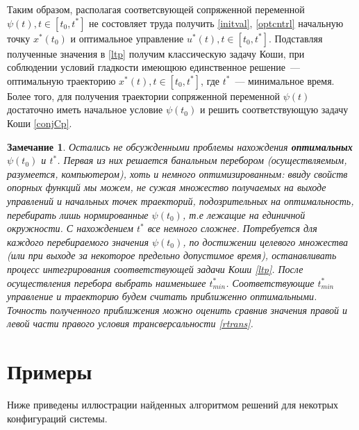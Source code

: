 \documentclass[oneside,final,11pt]{article}
\newcommand*\segm[2]{[#1,#2]}
\newtheorem*{remark}{Замечание}
\begin{document}
Таким образом, располагая соответсвующей сопряженной переменной \(\psi(t), t \in \segm{t_0}{t^*}\) не состовляет труда получить \eqref{initval}, \eqref{optcntrl} начальную точку \(x^*(t_0)\) и оптимальное управление \(u^*(t), t \in \segm{t_0}{t^*}\). Подставляя полученные значения в \eqref{ltp} получим классическую задачу Коши, при соблюдении условий гладкости имеющюю единственное решение~--- оптимальную траекторию \(x^*(t), t \in \segm{t_0}{t^*}\), где \(t^*\)~--- минимальное время. Более того, для получения траектории сопряженной переменной \(\psi(t)\) достаточно иметь начальное условие \(\psi(t_0)\) и решить соответствующую задачу Коши \eqref{conjCp}.
		{\theoremstyle{plain} \begin{remark}
			 Остались не обсужденными проблемы нахождения {\bfseries оптимальных} \(\psi(t_0)\) и \(t^*\). Первая из них решается банальным перебором (осуществляемым, разумеется, компьютером), хоть и немного оптимизированным: ввиду свойств опорных функций мы можем, не сужая множество получаемых на выходе управлений и начальных точек траекторий, подозрительных на оптимальность, перебирать лишь нормированные \(\psi(t_0)\), т.е лежащие на единичной окружности.  С нахождением \(t^*\) все немного сложнее. Потребуется для каждого перебираемого значения \(\psi(t_0)\), по достижении целевого множества (или при выходе за некоторое предельно допустимое время), останавливать процесс интегрирования соответствующей задачи Коши \eqref{ltp}. После осуществления перебора выбрать наименьшее \(t^*_{min}\). Соответствующие \(t^*_{min}\) управление и траекторию будем считать приближенно оптимальными. Точность полученного приближения можно оценить сравнив значения правой и левой части правого условия трансверсальности \eqref{rtrans}. 
		\end{remark}}

	\section{Примеры}
		Ниже приведены иллюстрации найденных алгоритмом решений для некотрых конфигураций системы.
		
		\newpage
\end{document}
